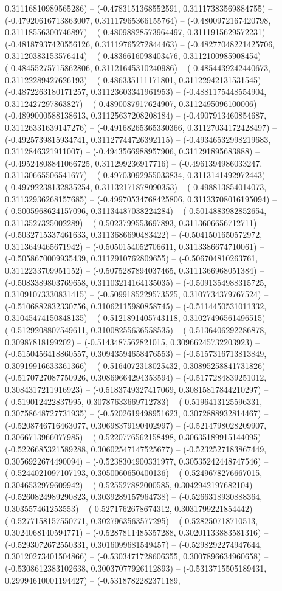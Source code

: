 0.31116810989565286) -- (-0.4783151368552591, 0.31117383569884755) -- (-0.47920616713863007, 0.31117965366155764) -- (-0.4800972167420798, 0.31118556300746897) -- (-0.48098828573964497, 0.3111915629572231) -- (-0.48187937420556126, 0.31119765272844463) -- (-0.48277048221425706, 0.31120383153576414) -- (-0.4836616098403476, 0.3112100985908454) -- (-0.48455275715862806, 0.31121645310240986) -- (-0.4854439242440673, 0.31122289427626193) -- (-0.486335111171801, 0.31122942131531545) -- (-0.4872263180171257, 0.31123603341961953) -- (-0.4881175448554904, 0.3112427297863827) -- (-0.4890087917624907, 0.3112495096100006) -- (-0.4899000588138613, 0.31125637208208184) -- (-0.4907913460854687, 0.31126331639147276) -- (-0.49168265365330366, 0.31127034172428497) -- (-0.4925739815934741, 0.31127744726392115) -- (-0.49346532998219683, 0.3112846321911007) -- (-0.4943566988957906, 0.311291895683888) -- (-0.49524808841066725, 0.311299236917716) -- (-0.4961394986033247, 0.31130665506541677) -- (-0.49703092955033834, 0.3113141492972443) -- (-0.49792238132835254, 0.31132171878090353) -- (-0.498813854014073, 0.31132936268157685) -- (-0.49970534768425806, 0.31133708016195094) -- (-0.5005968624157096, 0.31134487038224284) -- (-0.5014883982852654, 0.3113527325002289) -- (-0.5023799553697893, 0.3113606656712711) -- (-0.5032715337461633, 0.3113686690483422) -- (-0.5041501650572972, 0.3113649465671942) -- (-0.5050154052706611, 0.3113386674710061) -- (-0.5058670009935439, 0.3112910762809655) -- (-0.506704810263761, 0.3112233709951152) -- (-0.5075287894037465, 0.3111366968051384) -- (-0.5083389803769658, 0.31103214164135035) -- (-0.5091354988315725, 0.31091073330831415) -- (-0.5099185229573525, 0.3107734379767524) -- (-0.5106882832330756, 0.31062115980858745) -- (-0.5114450531011332, 0.31045474150848135) -- (-0.5121891405743118, 0.31027496561496515) -- (-0.5129208807549611, 0.31008255636558535) -- (-0.5136406292286878, 0.30987818199202) -- (-0.5143487562821015, 0.30966245732203923) -- (-0.5150456418860557, 0.30943594658476553) -- (-0.5157316713813849, 0.30919916633361366) -- (-0.5164072318025432, 0.30895258841731826) -- (-0.5170727087750926, 0.30869664294353594) -- (-0.5177284839251012, 0.3084317211916923) -- (-0.5183749327417069, 0.30815817844210297) -- (-0.519012422837995, 0.30787633669712783) -- (-0.5196413125596331, 0.30758648727731935) -- (-0.5202619498951623, 0.3072888932814467) -- (-0.5208746716463077, 0.30698379190402997) -- (-0.5214798028209907, 0.3066713966077985) -- (-0.5220776562158498, 0.30635189915144095) -- (-0.5226685321589288, 0.30602547147525677) -- (-0.5232527183867449, 0.3056922674490094) -- (-0.5238304900331977, 0.30535242448747546) -- (-0.5244021097107193, 0.3050060650400136) -- (-0.5249678276667015, 0.3046532979609942) -- (-0.525527882000585, 0.3042942197682104) -- (-0.5260824989290823, 0.3039289157964738) -- (-0.5266318930888364, 0.303557461253553) -- (-0.5271762678674312, 0.3031799221854442) -- (-0.5277158157550771, 0.3027963563577295) -- (-0.528250718710513, 0.3024068140594771) -- (-0.5287811485357288, 0.30201133883581316) -- (-0.5293072672550331, 0.3016099681549457) -- (-0.5298292274947644, 0.30120273401504866) -- (-0.5303471728606355, 0.3007896634960658) -- (-0.5308612383102638, 0.30037077926112893) -- (-0.5313715505189431, 0.29994610001194427) -- (-0.5318782282371189, 